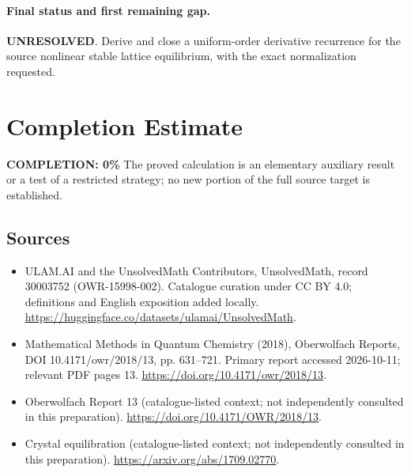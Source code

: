 \documentclass[11pt]{article}
\begin{document}
\paragraph{Final status and first remaining gap.}
\textbf{UNRESOLVED}. Derive and close a uniform-order derivative recurrence for the source nonlinear stable lattice equilibrium, with the exact normalization requested.

\section{Completion Estimate}
\noindent\textbf{COMPLETION: 0\%}
The proved calculation is an elementary auxiliary result or a test of a restricted strategy; no new portion of the full source target is established.

\subsection{Sources}
\begin{itemize}
\item[\hypertarget{source:30003752:1}{S1}] ULAM.AI and the UnsolvedMath Contributors, UnsolvedMath, record 30003752 (OWR-15998-002). Catalogue curation under CC BY 4.0; definitions and English exposition added locally.
\url{https://huggingface.co/datasets/ulamai/UnsolvedMath}.
\item[\hypertarget{source:30003752:2}{S2}] Mathematical Methods in Quantum Chemistry (2018), Oberwolfach Reports, DOI 10.4171/owr/2018/13, pp. 631--721. Primary report accessed 2026-10-11; relevant PDF pages 13.
\url{https://doi.org/10.4171/owr/2018/13}.
\item[\hypertarget{source:30003752:3}{S3}] Oberwolfach Report 13 (catalogue-listed context; not independently consulted in this preparation).
\url{https://doi.org/10.4171/OWR/2018/13}.
\item[\hypertarget{source:30003752:4}{S4}] Crystal equilibration (catalogue-listed context; not independently consulted in this preparation).
\url{https://arxiv.org/abs/1709.02770}.
\end{itemize}
\label{end:30003752}
\end{document}
